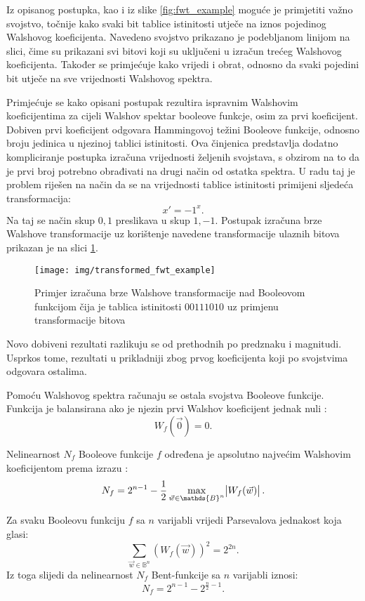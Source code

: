 Iz opisanog postupka, kao i iz slike \ref{fig:fwt_example} moguće je primjetiti važno svojstvo, točnije kako svaki bit tablice istinitosti utječe na iznos pojedinog Walshovog koeficijenta. 
Navedeno svojstvo prikazano je podebljanom linijom na slici, čime su prikazani svi bitovi koji su uključeni u izračun trećeg Walshovog koeficijenta.
Također se primjećuje kako vrijedi i obrat, odnosno da svaki pojedini bit utječe na sve vrijednosti Walshovog spektra.

Primjećuje se kako opisani postupak rezultira ispravnim Walshovim koeficijentima za cijeli Walshov spektar booleove funkcje, osim za prvi koeficijent.
Dobiven prvi koeficijent odgovara Hammingovoj težini Booleove funkcije, odnosno broju jedinica u njezinoj tablici istinitosti.
Ova činjenica predstavlja dodatno kompliciranje postupka izračuna vrijednosti željenih svojstava, s obzirom na to da je prvi broj potrebno obrađivati na drugi način od ostatka spektra.
U radu \cite{MeasuringBoolean} taj je problem riješen na način da se na vrijednosti tablice istinitosti primijeni sljedeća transformacija:
\begin{equation}
    x' = -1^x.
\end{equation}
Na taj se način skup ${0, 1}$ preslikava u skup ${1, -1}$.
Postupak izračuna brze Walshove transformacije uz korištenje navedene transformacije ulaznih bitova prikazan je na slici \ref{fig:transformed_fwt_example}.
\begin{figure}[ht!] 
    \centering
    \texttt{[image: img/transformed\_fwt\_example]}
    \captionsetup{justification=centering}
    \caption{Primjer izračuna brze Walshove transformacije nad Booleovom funkcijom čija je tablica istinitosti $00111010$ uz primjenu transformacije bitova}
    \label{fig:transformed_fwt_example}
\end{figure}
Novo dobiveni rezultati razlikuju se od prethodnih po predznaku i magnitudi.
Usprkos tome, rezultati u prikladniji zbog prvog koeficijenta koji po svojstvima odgovara ostalima.

Pomoću Walshovog spektra računaju se ostala svojstva Booleove funkcije.
Funkcija je balansirana ako je njezin prvi Walshov koeficijent jednak nuli \cite{MaximalNonlinearity}:
\begin{equation}
    W_f(\vec{0}) = 0.
\end{equation} 

Nelinearnost $N_f$ Booleove funkcije $f$ određena je apsolutno najvećim Walshovim koeficijentom prema izrazu \cite{MaximalNonlinearity}:
\begin{equation}
    N_f = 2^{n-1} - \frac{1}{2}\max_{\vec{w} \in \mathds{B}^n} \abs{W_f(\vec{w})}.
\end{equation}

Za svaku Booleovu funkciju $f$ sa $n$ varijabli vrijedi Parsevalova jednakost koja glasi:
\begin{equation}
    \sum_{\vec{w}\in \mathds{B}^n} \left( W_f(\vec{w}) \right)^2 = 2^{2n}.
\end{equation} 
Iz toga slijedi da nelinearnost $N_f$ Bent-funkcije sa $n$ varijabli iznosi:
\begin{equation}
    N_f = 2^{n-1} - 2^{\frac{n}{2}-1}.
\end{equation}